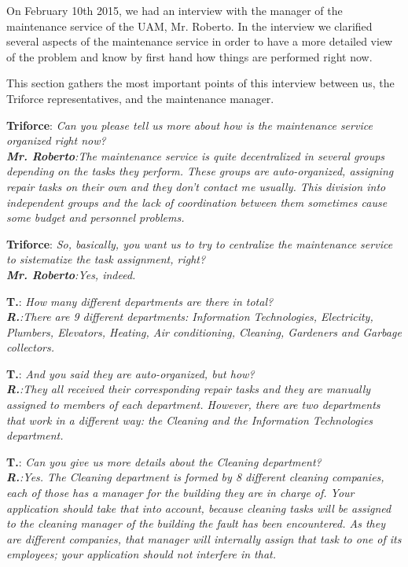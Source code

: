 
\newcommand{\interviewer}[1]{\vspace{12pt}\indent \textbf{#1}:\hspace{10pt} \itshape}
\newcommand{\interviewee}[1]{\\ \indent \upshape \textbf{#1}:\hspace{10pt}}

\newcommand{\tsc}{\interviewer{Triforce}}
\newcommand{\rsc}{\interviewee{Mr. Roberto}}
\newcommand{\ts}{\interviewer{T.}}
\newcommand{\rs}{\interviewee{R.}}

On February 10th 2015, we had an interview with the manager of the maintenance service of the UAM, Mr. Roberto. In the interview we clarified several aspects of the maintenance service in order to have a more detailed view of the problem and know by first hand how things are performed right now.

This section gathers the most important points of this interview between us, the Triforce representatives, and the maintenance manager.

\tsc Can you please tell us more about how is the maintenance service organized right now?
\rsc The maintenance service is quite decentralized in several groups depending on the tasks they perform. These groups are auto-organized, assigning repair tasks on their own and they don't contact me usually. This division into independent groups and the lack of coordination between them sometimes cause some budget and personnel problems.

\tsc So, basically, you want us to try to centralize the maintenance service to sistematize the task assignment, right?
\rsc Yes, indeed.

\ts How many different departments are there in total?
\rs There are 9 different departments: Information Technologies, Electricity, Plumbers, Elevators, Heating, Air conditioning, Cleaning, Gardeners and Garbage collectors.

\ts And you said they are auto-organized, but how?
\rs They all received their corresponding repair tasks and they are manually assigned to members of each department. However, there are two departments that work in a different way: the Cleaning and the Information Technologies department.

\ts Can you give us more details about the Cleaning department?
\rs Yes. The Cleaning department is formed by 8 different cleaning companies, each of those has a manager for the building they are in charge of. Your application should take that into account, because cleaning tasks will be assigned to the cleaning manager of the building the fault has been encountered. As they are different companies, that manager will internally assign that task to one of its employees; your application should not interfere in that.

